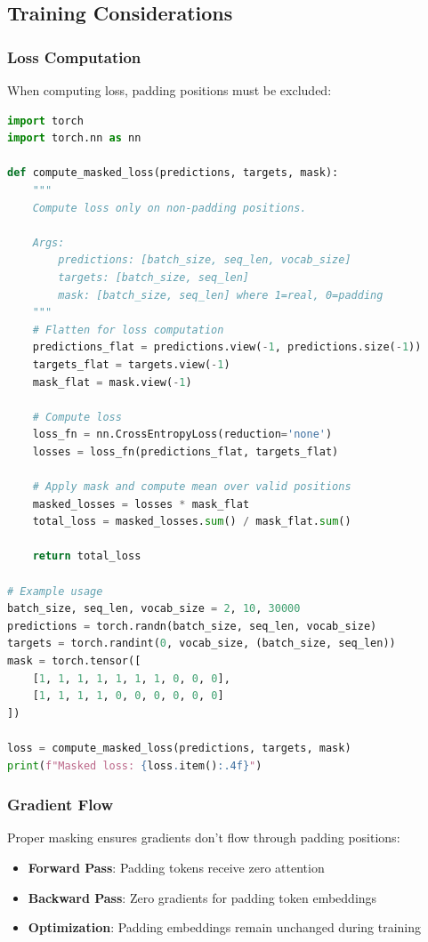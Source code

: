 \subsection{Training Considerations}

\subsubsection{Loss Computation}
When computing loss, padding positions must be excluded:

\begin{lstlisting}[language=Python, caption=Masked Loss Computation]
import torch
import torch.nn as nn

def compute_masked_loss(predictions, targets, mask):
    """
    Compute loss only on non-padding positions.
    
    Args:
        predictions: [batch_size, seq_len, vocab_size]
        targets: [batch_size, seq_len]
        mask: [batch_size, seq_len] where 1=real, 0=padding
    """
    # Flatten for loss computation
    predictions_flat = predictions.view(-1, predictions.size(-1))
    targets_flat = targets.view(-1)
    mask_flat = mask.view(-1)
    
    # Compute loss
    loss_fn = nn.CrossEntropyLoss(reduction='none')
    losses = loss_fn(predictions_flat, targets_flat)
    
    # Apply mask and compute mean over valid positions
    masked_losses = losses * mask_flat
    total_loss = masked_losses.sum() / mask_flat.sum()
    
    return total_loss

# Example usage
batch_size, seq_len, vocab_size = 2, 10, 30000
predictions = torch.randn(batch_size, seq_len, vocab_size)
targets = torch.randint(0, vocab_size, (batch_size, seq_len))
mask = torch.tensor([
    [1, 1, 1, 1, 1, 1, 1, 0, 0, 0],
    [1, 1, 1, 1, 0, 0, 0, 0, 0, 0]
])

loss = compute_masked_loss(predictions, targets, mask)
print(f"Masked loss: {loss.item():.4f}")
\end{lstlisting}

\subsubsection{Gradient Flow}
Proper masking ensures gradients don't flow through padding positions:
\begin{itemize}
\item \textbf{Forward Pass}: Padding tokens receive zero attention
\item \textbf{Backward Pass}: Zero gradients for padding token embeddings
\item \textbf{Optimization}: Padding embeddings remain unchanged during training
\end{itemize}

